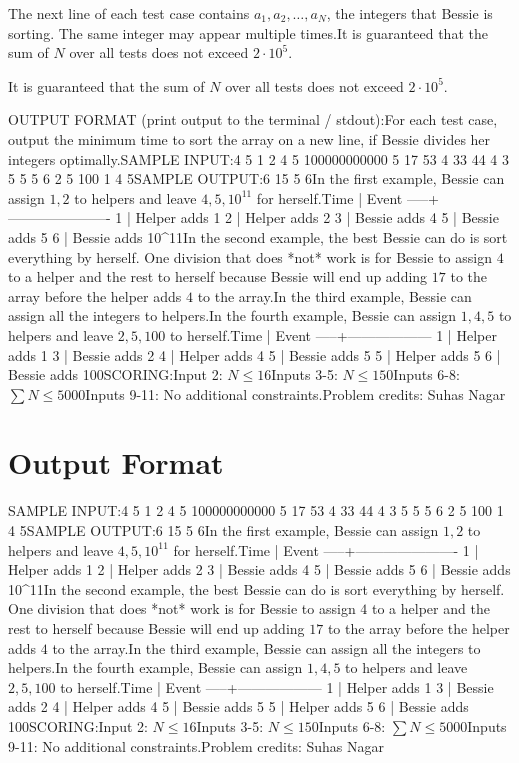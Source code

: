 \documentclass[12pt]{article}
\begin{document}
The next line of each test case contains $a_1, a_2, \dots, a_N$, the integers
that Bessie is sorting. The same integer may appear multiple times.It is guaranteed that the sum of $N$ over all tests does not exceed
$2\cdot 10^5$.

It is guaranteed that the sum of $N$ over all tests does not exceed
$2\cdot 10^5$.

OUTPUT FORMAT (print output to the terminal / stdout):For each test case, output the minimum time to sort the array on a new line, if
Bessie divides her integers optimally.SAMPLE INPUT:4
5
1 2 4 5 100000000000
5
17 53 4 33 44
4
3 5 5 5
6
2 5 100 1 4 5SAMPLE OUTPUT:6
15
5
6In the first example, Bessie can assign $1,2$ to helpers and leave $4,5,10^{11}$
for herself.Time | Event
-----+----------------------
1    | Helper adds 1
2    | Helper adds 2
3    | Bessie adds 4
5    | Bessie adds 5
6    | Bessie adds 10^{11}In the second example, the best Bessie can do is sort everything by herself. One
division that does *not* work is for Bessie to assign $4$ to a helper and the
rest to herself because Bessie will end up adding $17$ to the array before the
helper adds $4$ to the array.In the third example, Bessie can assign all the integers to helpers.In the fourth example, Bessie can assign $1,4,5$ to helpers and leave $2,5,100$
to herself.Time | Event
-----+------------------
1    | Helper adds 1
3    | Bessie adds 2
4    | Helper adds 4
5    | Bessie adds 5
5    | Helper adds 5
6    | Bessie adds 100SCORING:Input 2: $N\le 16$Inputs 3-5: $N\le 150$Inputs 6-8: $\sum N\le 5000$Inputs 9-11: No additional constraints.Problem credits: Suhas Nagar

\section*{Output Format}
SAMPLE INPUT:4
5
1 2 4 5 100000000000
5
17 53 4 33 44
4
3 5 5 5
6
2 5 100 1 4 5SAMPLE OUTPUT:6
15
5
6In the first example, Bessie can assign $1,2$ to helpers and leave $4,5,10^{11}$
for herself.Time | Event
-----+----------------------
1    | Helper adds 1
2    | Helper adds 2
3    | Bessie adds 4
5    | Bessie adds 5
6    | Bessie adds 10^{11}In the second example, the best Bessie can do is sort everything by herself. One
division that does *not* work is for Bessie to assign $4$ to a helper and the
rest to herself because Bessie will end up adding $17$ to the array before the
helper adds $4$ to the array.In the third example, Bessie can assign all the integers to helpers.In the fourth example, Bessie can assign $1,4,5$ to helpers and leave $2,5,100$
to herself.Time | Event
-----+------------------
1    | Helper adds 1
3    | Bessie adds 2
4    | Helper adds 4
5    | Bessie adds 5
5    | Helper adds 5
6    | Bessie adds 100SCORING:Input 2: $N\le 16$Inputs 3-5: $N\le 150$Inputs 6-8: $\sum N\le 5000$Inputs 9-11: No additional constraints.Problem credits: Suhas Nagar
\end{document}
